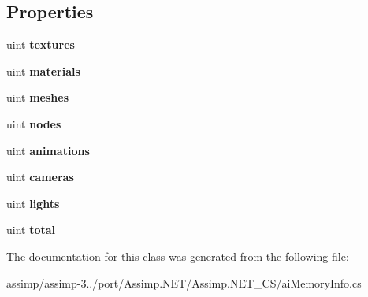 \subsection*{Properties}
\begin{DoxyCompactItemize}
\item 
\hypertarget{classai_memory_info_a75a823477812703a1048b3fc3445231d}{uint {\bfseries textures}}\label{classai_memory_info_a75a823477812703a1048b3fc3445231d}

\item 
\hypertarget{classai_memory_info_a133efb349bb7c4caa30e115c28049bdd}{uint {\bfseries materials}}\label{classai_memory_info_a133efb349bb7c4caa30e115c28049bdd}

\item 
\hypertarget{classai_memory_info_a42304d12578a2b91d4831efe90eb786e}{uint {\bfseries meshes}}\label{classai_memory_info_a42304d12578a2b91d4831efe90eb786e}

\item 
\hypertarget{classai_memory_info_ab1a726a140d90d4a7669e363a7a3a870}{uint {\bfseries nodes}}\label{classai_memory_info_ab1a726a140d90d4a7669e363a7a3a870}

\item 
\hypertarget{classai_memory_info_a4019d4e5c60ada5002e162fb626d295b}{uint {\bfseries animations}}\label{classai_memory_info_a4019d4e5c60ada5002e162fb626d295b}

\item 
\hypertarget{classai_memory_info_a690dd60bcff3c66fdeb9a77e92ba57b1}{uint {\bfseries cameras}}\label{classai_memory_info_a690dd60bcff3c66fdeb9a77e92ba57b1}

\item 
\hypertarget{classai_memory_info_a9e78ce23138cd255c7cc9af2529ae5b9}{uint {\bfseries lights}}\label{classai_memory_info_a9e78ce23138cd255c7cc9af2529ae5b9}

\item 
\hypertarget{classai_memory_info_ab5878103c59c853149401277b5cc4692}{uint {\bfseries total}}\label{classai_memory_info_ab5878103c59c853149401277b5cc4692}

\end{DoxyCompactItemize}


The documentation for this class was generated from the following file\+:\begin{DoxyCompactItemize}
\item 
assimp/assimp-\/3../port/\+Assimp.\+N\+E\+T/\+Assimp.\+N\+E\+T\+\_\+\+C\+S/ai\+Memory\+Info.\+cs\end{DoxyCompactItemize}
